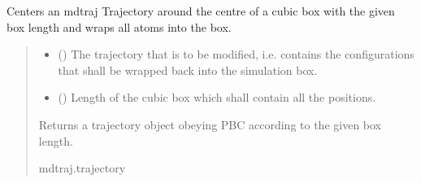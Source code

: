 \documentclass[a4paper,10pt,english]{report}
\begin{document}
\begin{fulllineitems}
\label{\detokenize{NNucleate:NNucleate.utils.pbc}}
\pysigstartsignatures
{}
\pysigstopsignatures
\sphinxAtStartPar
Centers an mdtraj Trajectory around the centre of a cubic box with the given box length and wraps all atoms into the box.
\begin{quote}\begin{description}
\begin{itemize}
\item {} 
\sphinxAtStartPar
{} () \textendash{} The trajectory that is to be modified, i.e. contains the configurations that shall be wrapped back into the simulation box.

\item {} 
\sphinxAtStartPar
{} () \textendash{} Length of the cubic box which shall contain all the positions.

\end{itemize}

\sphinxAtStartPar
Returns a trajectory object obeying PBC according to the given box length.

\sphinxAtStartPar
mdtraj.trajectory

\end{description}\end{quote}

\end{fulllineitems}

\end{document}
